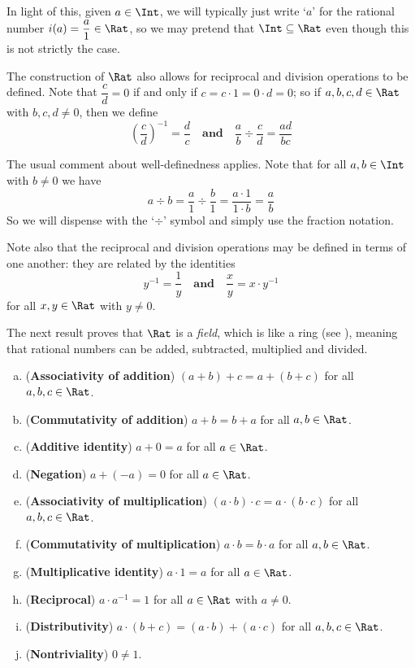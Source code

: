 In light of this, given $a \in \Int$, we will typically just write `$a$' for the rational number $i(a) = \dfrac{a}{1} \in \Rat$, so we may pretend that $\Int \subseteq \Rat$ even though this is not strictly the case.

The construction of $\Rat$ also allows for reciprocal and division operations to be defined. Note that $\dfrac{c}{d} = 0$ if and only if $c = c \cdot 1 = 0 \cdot d = 0$; so if $a,b,c,d \in \Rat$ with $b,c,d \ne 0$, then we define
\[ \left(\dfrac{c}{d} \right)^{-1} = \dfrac{d}{c} \quad \textbf{and} \quad \frac{a}{b} \div \frac{c}{d} = \dfrac{ad}{bc} \]

The usual comment about well-definedness applies. Note that for all $a,b \in \Int$ with $b \ne 0$ we have
\[ a \div b = \dfrac{a}{1} \div \dfrac{b}{1} = \dfrac{a \cdot 1}{1 \cdot b} = \dfrac{a}{b} \]
So we will dispense with the `$\div$' symbol and simply use the fraction notation.

Note also that the reciprocal and division operations may be defined in terms of one another: they are related by the identities
\[ y^{-1} = \dfrac{1}{y} \quad \textbf{and} \quad \dfrac{x}{y} = x \cdot y^{-1} \]
for all $x,y \in \Rat$ with $y \ne 0$.

The next result proves that $\Rat$ is a \textit{field}, which is like a ring (see ), meaning that rational numbers can be added, subtracted, multiplied and divided.

\begin{theorem}
\label{thmQIsAField}
\fixlistskip%
\begin{enumerate}[(a)]
\item (\textbf{Associativity of addition}) $(a+b)+c = a+(b+c)$ for all $a,b,c \in \Rat$.
\item (\textbf{Commutativity of addition}) $a+b=b+a$ for all $a,b \in \Rat$.
\item (\textbf{Additive identity}) $a+0 = a$ for all $a \in \Rat$.
\item (\textbf{Negation}) $a + (-a) = 0$ for all $a \in \Rat$.
\item (\textbf{Associativity of multiplication}) $(a \cdot b) \cdot c = a \cdot (b \cdot c)$ for all $a,b,c \in \Rat$.
\item (\textbf{Commutativity of multiplication}) $a \cdot b = b \cdot a$ for all $a,b \in \Rat$.
\item (\textbf{Multiplicative identity}) $a \cdot 1 = a$ for all $a \in \Rat$.
\item (\textbf{Reciprocal}) $a \cdot a^{-1} = 1$ for all $a \in \Rat$ with $a \ne 0$.
\item (\textbf{Distributivity}) $a \cdot (b + c) = (a \cdot b) + (a \cdot c)$ for all $a,b,c \in \Rat$.
\item (\textbf{Nontriviality}) $0 \ne 1$.
\end{enumerate}
\end{theorem}

